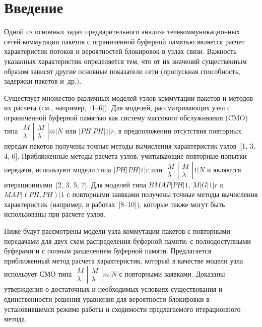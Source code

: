       \begin{multicols}{2}

      \label{st\stat}


\section{Введение}

    Одной из основных задач предварительного анализа 
телекоммуникационных сетей коммутации пакетов с ограниченной буферной 
памятью является расчет характеристик потоков и вероятностей блокировок в 
узлах связи. Важность указанных характеристик определяется тем, что от их 
значений существенным образом зависят другие основные показатели сети 
(пропускная способность, задержки пакетов и~др.). 

    Существует множество различных моделей узлов коммутации пакетов и 
методов их расчета (см., например,~[1--6]). Для моделей, рассматривающих 
узел с ограниченной буферной памятью как систему массового обслуживания 
(CMO) типа 
$
\begin{matrix}
M \\ \lambda
\end{matrix}
\left |
\begin{matrix}
M \\ \lambda
\end{matrix}
\right |
\overline{m} \vert N
$ или  $\vert PH\vert PH\vert 1\vert r$, в предположении отсутствия повторных 
передач пакетов получены точные методы вычисления характеристик 
узлов~[1, 3, 4, 6]. Приближенные методы расчета узлов, учитывающие повторные 
попытки передачи, используют модели типа $\vert PH\vert PH\vert 1\vert r$ или 
$
\begin{matrix}
M \\ \lambda
\end{matrix}
\left |
\begin{matrix}
M \\ \lambda
\end{matrix}
\right |
1 \vert N
$ и являются 
итерационными~[2, 3, 5, 7]. Для моделей типа 
$BM\!AP\vert PH\vert 1$, $M\vert G\vert 1\vert r$ и $M\!AP\vert 
(PH,PH)\vert 1$ с повторными заявками получены точные методы вычисления 
характеристик (например, в работах~[8--10]), которые также могут быть 
использованы при расчете узлов.

    Ниже будут рассмотрены модели узла коммутации пакетов с повторными 
передачами для двух схем распределения буферной памяти: с 
полнодоступными буферами и с полным разделением буферной памяти. 
Предлагается приближенный метод расчета характеристик, который в качестве 
модели узла использует СМО типа $
\begin{matrix}
M \\ \lambda
\end{matrix}
\left |
\begin{matrix}
M \\ \lambda
\end{matrix}
\right |
\overline{m} \vert N
$ с повторными заявками. Доказаны утверждения о 
достаточных и необходимых условиях существования и единственности 
решения уравнения для вероятности блокировки в установившемся режиме 
работы и сходимости предлагаемого итерационного метода. 


\end{multicols}
